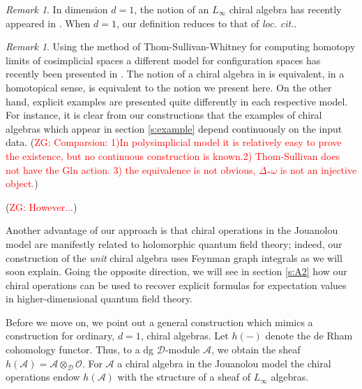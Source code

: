 \documentclass[11pt]{amsart}
\theoremstyle{definition}
\theoremstyle{remark}
\newtheorem{rem}[thm]{Remark}
\numberwithin{equation}{section}
\newcommand{\cA}{\mathcal{A}}
\newcommand{\Gui}[1]{(\textcolor{red}{ZG: #1})}
\begin{document}
\begin{rem}
  In dimension $d=1$, the notion of an $L_\infty$ chiral algebra has recently appeared in \cite{malikov2024homotopy}. When $d=1$, our definition reduces to that of \textit{loc. cit.}.
\end{rem}

\begin{rem}
  Using the method of Thom-Sullivan-Whitney for computing homotopy limits of cosimplicial spaces a different model for
  configuration spaces has recently been presented in \cite{FGY}.
  The notion of a chiral algebra in \cite{FGY} is equivalent, in a homotopical sense, is equivalent to the notion we
  present here.
  On the other hand, explicit examples are presented quite differently in each respective model.
  For instance, it is clear from our constructions that the examples of chiral algebras which appear in section
  \ref{s:example} depend continuously on the input data. \Gui{Comparsion: 1)In polysimplicial model it is relatively easy to prove the existence, but no continuous construction is known.2) Thom-Sullivan does not have the Gln action. 3) the equivalence is not obvious, $\Delta_*\omega$ is not an injective object.}

  \Gui{However...}

  Another advantage of our approach is that chiral operations in the Jouanolou model are manifestly related to
  holomorphic quantum field theory; indeed, our construction of the \textit{unit} chiral algebra uses Feynman graph
  integrals as we will soon explain.
  Going the opposite direction, we will see in section \ref{s:A2} how our chiral operations can be used to recover
  explicit formulas for expectation values in higher-dimensional quantum field theory.
\end{rem}

Before we move on, we point out a general construction which mimics a construction for ordinary, $d=1$, chiral
algebras.
Let $h(-)$ denote the de Rham cohomology functor.
Thus, to a dg $\mathcal{D}$-module $\mathcal{A}$, we obtain the sheaf $h(\mathcal{A}) = \cA\otimes_{\mathcal{\mathcal{D}}}\mathcal{O}$. For $\mathcal{A}$ a chiral algebra in the Jouanolou model the chiral operations endow $h(\mathcal{A})$ with
the structure of a sheaf of $L_\infty$ algebras.
\end{document}
